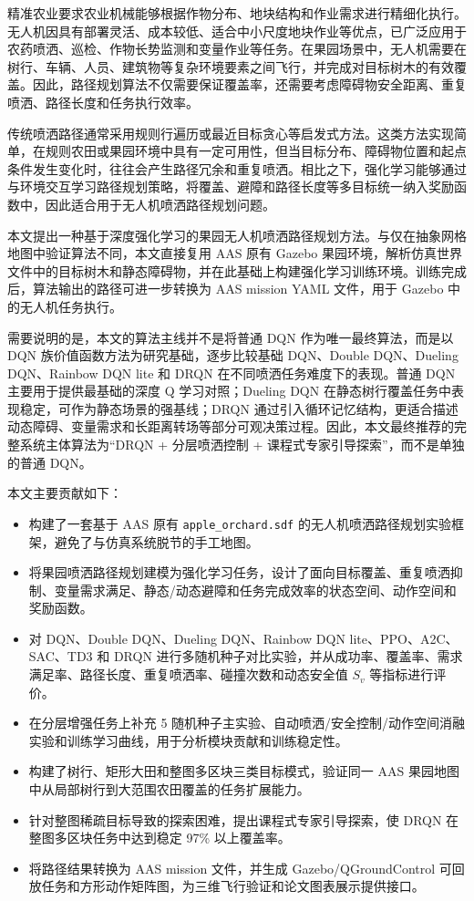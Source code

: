 \documentclass[UTF8]{ctexart}
\begin{document}
精准农业要求农业机械能够根据作物分布、地块结构和作业需求进行精细化执行。无人机因具有部署灵活、成本较低、适合中小尺度地块作业等优点，已广泛应用于农药喷洒、巡检、作物长势监测和变量作业等任务。在果园场景中，无人机需要在树行、车辆、人员、建筑物等复杂环境要素之间飞行，并完成对目标树木的有效覆盖。因此，路径规划算法不仅需要保证覆盖率，还需要考虑障碍物安全距离、重复喷洒、路径长度和任务执行效率。

传统喷洒路径通常采用规则行遍历或最近目标贪心等启发式方法。这类方法实现简单，在规则农田或果园环境中具有一定可用性，但当目标分布、障碍物位置和起点条件发生变化时，往往会产生路径冗余和重复喷洒。相比之下，强化学习能够通过与环境交互学习路径规划策略，将覆盖、避障和路径长度等多目标统一纳入奖励函数中，因此适合用于无人机喷洒路径规划问题。

本文提出一种基于深度强化学习的果园无人机喷洒路径规划方法。与仅在抽象网格地图中验证算法不同，本文直接复用 AAS 原有 Gazebo 果园环境，解析仿真世界文件中的目标树木和静态障碍物，并在此基础上构建强化学习训练环境。训练完成后，算法输出的路径可进一步转换为 AAS mission YAML 文件，用于 Gazebo 中的无人机任务执行。

需要说明的是，本文的算法主线并不是将普通 DQN 作为唯一最终算法，而是以 DQN 族价值函数方法为研究基础，逐步比较基础 DQN、Double DQN、Dueling DQN、Rainbow DQN lite 和 DRQN 在不同喷洒任务难度下的表现。普通 DQN 主要用于提供最基础的深度 Q 学习对照；Dueling DQN 在静态树行覆盖任务中表现稳定，可作为静态场景的强基线；DRQN 通过引入循环记忆结构，更适合描述动态障碍、变量需求和长距离转场等部分可观决策过程。因此，本文最终推荐的完整系统主体算法为“DRQN + 分层喷洒控制 + 课程式专家引导探索”，而不是单独的普通 DQN。

本文主要贡献如下：
\begin{itemize}
  \item 构建了一套基于 AAS 原有 \texttt{apple\_orchard.sdf} 的无人机喷洒路径规划实验框架，避免了与仿真系统脱节的手工地图。
  \item 将果园喷洒路径规划建模为强化学习任务，设计了面向目标覆盖、重复喷洒抑制、变量需求满足、静态/动态避障和任务完成效率的状态空间、动作空间和奖励函数。
  \item 对 DQN、Double DQN、Dueling DQN、Rainbow DQN lite、PPO、A2C、SAC、TD3 和 DRQN 进行多随机种子对比实验，并从成功率、覆盖率、需求满足率、路径长度、重复喷洒率、碰撞次数和动态安全值 $S_v$ 等指标进行评价。
  \item 在分层增强任务上补充 5 随机种子主实验、自动喷洒/安全控制/动作空间消融实验和训练学习曲线，用于分析模块贡献和训练稳定性。
  \item 构建了树行、矩形大田和整图多区块三类目标模式，验证同一 AAS 果园地图中从局部树行到大范围农田覆盖的任务扩展能力。
  \item 针对整图稀疏目标导致的探索困难，提出课程式专家引导探索，使 DRQN 在整图多区块任务中达到稳定 97\% 以上覆盖率。
  \item 将路径结果转换为 AAS mission 文件，并生成 Gazebo/QGroundControl 可回放任务和方形动作矩阵图，为三维飞行验证和论文图表展示提供接口。
\end{itemize}
\end{document}
